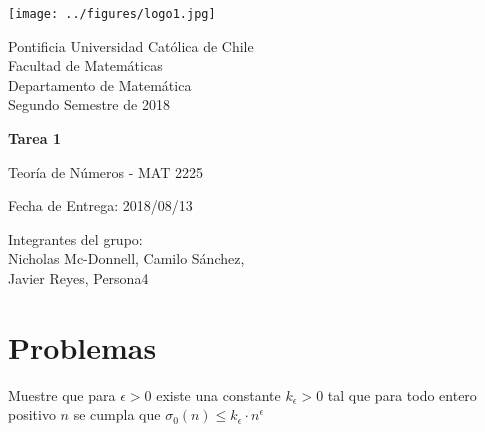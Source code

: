 


\begin{minipage}{2.5cm}
	\texttt{[image: ../figures/logo1.jpg]}
\end{minipage}
\begin{minipage}{13cm}
	\begin{flushleft}
		\raggedright
		{
			\noindent
			{\sc Pontificia Universidad Católica de Chile\\
				Facultad de Matemáticas\\
				Departamento de Matemática} \smallskip \\
			Segundo Semestre de 2018\\
		}
	\end{flushleft}
\end{minipage}

\vspace{2ex}
{\Large \centerline{\bf Tarea 1}}
{\large \centerline{Teoría de Números - MAT 2225}}
\centerline{Fecha de Entrega: 2018/08/13}

\begin{flushright}
	Integrantes del grupo:\\
	Nicholas Mc-Donnell, Camilo Sánchez,\\
	Javier Reyes, Persona4
\end{flushright}

\section{Problemas}

\begin{prob}
	Muestre que para $\epsilon>0$ existe una constante $k_\epsilon>0$ tal que para todo entero positivo $n$ se cumpla que $\sigma_0(n)\leq k_\epsilon\cdot n^\epsilon$
\end{prob}

